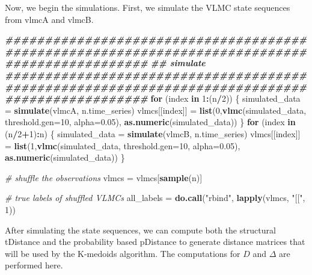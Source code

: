 \documentclass[
]{article}
\newenvironment{Shaded}{\begin{snugshade}}{\end{snugshade}}
\newcommand{\AttributeTok}[1]{\textcolor[rgb]{0.13,0.29,0.53}{#1}}
\newcommand{\CommentTok}[1]{\textcolor[rgb]{0.56,0.35,0.01}{\textit{#1}}}
\newcommand{\ControlFlowTok}[1]{\textcolor[rgb]{0.13,0.29,0.53}{\textbf{#1}}}
\newcommand{\DecValTok}[1]{\textcolor[rgb]{0.00,0.00,0.81}{#1}}
\newcommand{\DocumentationTok}[1]{\textcolor[rgb]{0.56,0.35,0.01}{\textbf{\textit{#1}}}}
\newcommand{\FloatTok}[1]{\textcolor[rgb]{0.00,0.00,0.81}{#1}}
\newcommand{\FunctionTok}[1]{\textcolor[rgb]{0.13,0.29,0.53}{\textbf{#1}}}
\newcommand{\NormalTok}[1]{#1}
\newcommand{\OtherTok}[1]{\textcolor[rgb]{0.56,0.35,0.01}{#1}}
\newcommand{\SpecialCharTok}[1]{\textcolor[rgb]{0.81,0.36,0.00}{\textbf{#1}}}
\newcommand{\StringTok}[1]{\textcolor[rgb]{0.31,0.60,0.02}{#1}}
\begin{document}
Now, we begin the simulations. First, we simulate the VLMC state
sequences from vlmcA and vlmcB.

\begin{Shaded}
\begin{Highlighting}[]
\DocumentationTok{\#\#\#\#\#\#\#\#\#\#\#\#\#\#\#\#\#\#\#\#\#\#\#\#\#\#\#\#\#\#\#\#\#\#\#\#\#\#\#\#\#\#\#\#\#\#\#\#\#\#\#\#\#\#\#\#\#\#\#\#\#\#\#\#\#\#\#\#\#\#\#\#\#\#\#\#\#\#\#\#\#\#\#\#\#\#\#\#\#\#\#\#\#\#}
\DocumentationTok{\#\# simulate}
\DocumentationTok{\#\#\#\#\#\#\#\#\#\#\#\#\#\#\#\#\#\#\#\#\#\#\#\#\#\#\#\#\#\#\#\#\#\#\#\#\#\#\#\#\#\#\#\#\#\#\#\#\#\#\#\#\#\#\#\#\#\#\#\#\#\#\#\#\#\#\#\#\#\#\#\#\#\#\#\#\#\#\#\#\#\#\#\#\#\#\#\#\#\#\#\#\#\#}
\ControlFlowTok{for}\NormalTok{ (index }\ControlFlowTok{in} \DecValTok{1}\SpecialCharTok{:}\NormalTok{(n}\SpecialCharTok{/}\DecValTok{2}\NormalTok{))}
\NormalTok{\{}
\NormalTok{  simulated\_data }\OtherTok{=} \FunctionTok{simulate}\NormalTok{(vlmcA, n.time\_series)}
\NormalTok{  vlmcs[[index]] }\OtherTok{=} \FunctionTok{list}\NormalTok{(}\DecValTok{0}\NormalTok{,}\FunctionTok{vlmc}\NormalTok{(simulated\_data, }\AttributeTok{threshold.gen=}\DecValTok{10}\NormalTok{, }\AttributeTok{alpha=}\FloatTok{0.05}\NormalTok{), }\FunctionTok{as.numeric}\NormalTok{(simulated\_data))}
\NormalTok{\}}
\ControlFlowTok{for}\NormalTok{ (index }\ControlFlowTok{in}\NormalTok{ (n}\SpecialCharTok{/}\DecValTok{2}\SpecialCharTok{+}\DecValTok{1}\NormalTok{)}\SpecialCharTok{:}\NormalTok{n)}
\NormalTok{\{}
\NormalTok{  simulated\_data }\OtherTok{=} \FunctionTok{simulate}\NormalTok{(vlmcB, n.time\_series)}
\NormalTok{  vlmcs[[index]] }\OtherTok{=} \FunctionTok{list}\NormalTok{(}\DecValTok{1}\NormalTok{,}\FunctionTok{vlmc}\NormalTok{(simulated\_data, }\AttributeTok{threshold.gen=}\DecValTok{10}\NormalTok{, }\AttributeTok{alpha=}\FloatTok{0.05}\NormalTok{), }\FunctionTok{as.numeric}\NormalTok{(simulated\_data))}
\NormalTok{\}   }

\CommentTok{\# shuffle the observations }
\NormalTok{vlmcs }\OtherTok{=}\NormalTok{ vlmcs[}\FunctionTok{sample}\NormalTok{(n)]}

\CommentTok{\# true labels of shuffled VLMCs}
\NormalTok{all\_labels }\OtherTok{=} \FunctionTok{do.call}\NormalTok{(}\StringTok{"rbind"}\NormalTok{, }\FunctionTok{lapply}\NormalTok{(vlmcs, }\StringTok{"[["}\NormalTok{, }\DecValTok{1}\NormalTok{))}
\end{Highlighting}
\end{Shaded}

After simulating the state sequences, we can compute both the structural
tDistance and the probability based pDistance to generate distance
matrices that will be used by the K-medoids algorithm. The computations
for \(D\) and \(\Delta\) are performed here.
\end{document}
